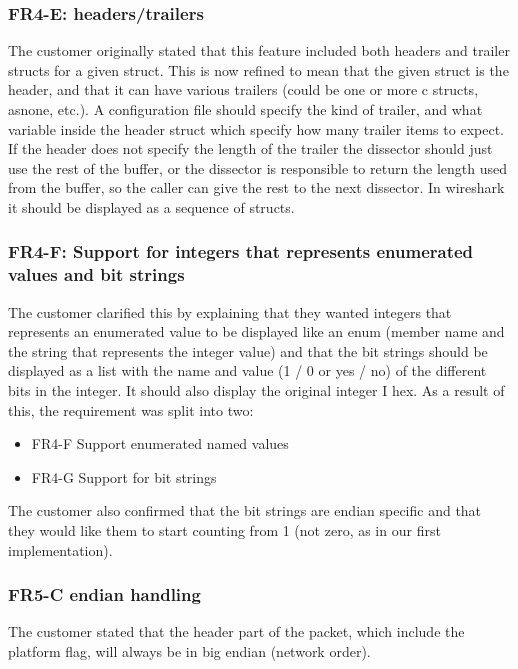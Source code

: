\subsubsection{FR4-E: \Glspl{header}/\gls{trailers}}
The customer originally stated that this feature included both \glspl{header} and trailer \glspl{struct} for a given \gls{struct}. This is now refined to mean that the given \gls{struct} is the \gls{header}, and that it can have various \gls{trailers} (could be one or more \Gls{c} \glspl{struct}, \gls{asnone}, etc.). A configuration file should specify the kind of trailer, and what variable inside the \gls{header} \gls{struct} which specify how many trailer items to expect. If the \gls{header} does not specify the length of the trailer the \gls{dissector} should just use the rest of the buffer, or the \gls{dissector} is responsible to return the length used from the buffer, so the caller can give the rest to the next \gls{dissector}.
In \Gls{wireshark} it should be displayed as a sequence of \glspl{struct}.

\subsubsection{FR4-F: Support for \glspl{integer} that represents enumerated values and \glspl{bit string}}
The customer clarified this by explaining that they wanted \glspl{integer} that represents an enumerated value to be displayed like an \gls{enum} (\gls{member} name and the \gls{string} that represents the \gls{integer} value) and that the \glspl{bit string} should be displayed as a list with the name and value (1 / 0 or yes / no) of the different bits in the \gls{integer}. It should also display the original \gls{integer} I hex. As a result of this, the requirement was split into two:
\begin{itemize}
\item FR4-F	Support \glspl{enumerated named value}
\item FR4-G	Support for \glspl{bit string}
\end{itemize}
The customer also confirmed that the \glspl{bit string} are \gls{endian} specific and that they would like them to start counting from 1 (not zero, as in our first implementation).

\subsubsection{FR5-C \Gls{endian} handling}
The customer stated that the \gls{header} part of the \gls{packet}, which include the platform flag, will always be in big \gls{endian} (network order).


